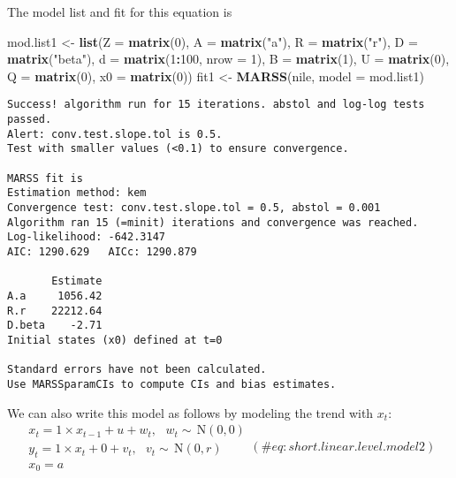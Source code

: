 \documentclass[12pt,]{book}
\newenvironment{Shaded}{\begin{snugshade}}{\end{snugshade}}
\newcommand{\DataTypeTok}[1]{\textcolor[rgb]{0.13,0.29,0.53}{#1}}
\newcommand{\DecValTok}[1]{\textcolor[rgb]{0.00,0.00,0.81}{#1}}
\newcommand{\KeywordTok}[1]{\textcolor[rgb]{0.13,0.29,0.53}{\textbf{#1}}}
\newcommand{\NormalTok}[1]{#1}
\newcommand{\OperatorTok}[1]{\textcolor[rgb]{0.81,0.36,0.00}{\textbf{#1}}}
\newcommand{\StringTok}[1]{\textcolor[rgb]{0.31,0.60,0.02}{#1}}
\begin{document}
The model list and fit for this equation is

\begin{Shaded}
\begin{Highlighting}[]
\NormalTok{mod.list1 <-}\StringTok{ }\KeywordTok{list}\NormalTok{(}\DataTypeTok{Z =} \KeywordTok{matrix}\NormalTok{(}\DecValTok{0}\NormalTok{), }\DataTypeTok{A =} \KeywordTok{matrix}\NormalTok{(}\StringTok{"a"}\NormalTok{), }\DataTypeTok{R =} \KeywordTok{matrix}\NormalTok{(}\StringTok{"r"}\NormalTok{), }
    \DataTypeTok{D =} \KeywordTok{matrix}\NormalTok{(}\StringTok{"beta"}\NormalTok{), }\DataTypeTok{d =} \KeywordTok{matrix}\NormalTok{(}\DecValTok{1}\OperatorTok{:}\DecValTok{100}\NormalTok{, }\DataTypeTok{nrow =} \DecValTok{1}\NormalTok{), }\DataTypeTok{B =} \KeywordTok{matrix}\NormalTok{(}\DecValTok{1}\NormalTok{), }
    \DataTypeTok{U =} \KeywordTok{matrix}\NormalTok{(}\DecValTok{0}\NormalTok{), }\DataTypeTok{Q =} \KeywordTok{matrix}\NormalTok{(}\DecValTok{0}\NormalTok{), }\DataTypeTok{x0 =} \KeywordTok{matrix}\NormalTok{(}\DecValTok{0}\NormalTok{))}
\NormalTok{fit1 <-}\StringTok{ }\KeywordTok{MARSS}\NormalTok{(nile, }\DataTypeTok{model =}\NormalTok{ mod.list1)}
\end{Highlighting}
\end{Shaded}

\begin{verbatim}
Success! algorithm run for 15 iterations. abstol and log-log tests passed.
Alert: conv.test.slope.tol is 0.5.
Test with smaller values (<0.1) to ensure convergence.

MARSS fit is
Estimation method: kem 
Convergence test: conv.test.slope.tol = 0.5, abstol = 0.001
Algorithm ran 15 (=minit) iterations and convergence was reached. 
Log-likelihood: -642.3147 
AIC: 1290.629   AICc: 1290.879   
 
       Estimate
A.a     1056.42
R.r    22212.64
D.beta    -2.71
Initial states (x0) defined at t=0

Standard errors have not been calculated. 
Use MARSSparamCIs to compute CIs and bias estimates.
\end{verbatim}

We can also write this model as follows by modeling the trend with \(x_t\):
\begin{equation}
\begin{gathered}
x_t = 1 \times x_{t-1} + u + w_t, \text{ } w_t \sim \,\text{N}(0,0) \\
y_t = 1 \times x_t + 0 + v_t, \text{ } v_t \sim \,\text{N}(0,r)  \\
x_0 = a 
\end{gathered}   
(\#eq:short.linear.level.model2)
\end{equation}
\end{document}
